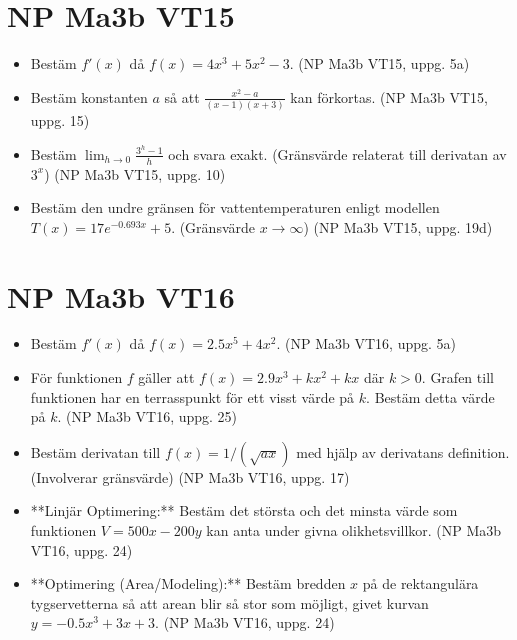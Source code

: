 \documentclass{article}
\begin{document}
\section*{NP Ma3b VT15}
\begin{itemize}
    \item Bestäm $f'(x)$ då $f(x) = 4x^3 + 5x^2 - 3$. (NP Ma3b VT15, uppg. 5a)
    \item Bestäm konstanten $a$ så att $\frac{x^2-a}{(x-1)(x+3)}$ kan förkortas. (NP Ma3b VT15, uppg. 15)
    \item Bestäm $\lim_{h \to 0} \frac{3^h - 1}{h}$ och svara exakt. (Gränsvärde relaterat till derivatan av $3^x$) (NP Ma3b VT15, uppg. 10)
    \item Bestäm den undre gränsen för vattentemperaturen enligt modellen $T(x) = 17e^{-0.693x} + 5$. (Gränsvärde $x \to \infty$) (NP Ma3b VT15, uppg. 19d)
\end{itemize}

\section*{NP Ma3b VT16}
\begin{itemize}
    \item Bestäm $f'(x)$ då $f(x) = 2.5x^5 + 4x^2$. (NP Ma3b VT16, uppg. 5a)
    \item För funktionen $f$ gäller att $f(x) = 2.9x^3 + kx^2 + kx$ där $k>0$. Grafen till funktionen har en terrasspunkt för ett visst värde på $k$. Bestäm detta värde på $k$. (NP Ma3b VT16, uppg. 25)
    \item Bestäm derivatan till $f(x) = 1/(\sqrt{ax})$ med hjälp av derivatans definition. (Involverar gränsvärde) (NP Ma3b VT16, uppg. 17)
    \item **Linjär Optimering:** Bestäm det största och det minsta värde som funktionen $V = 500x - 200y$ kan anta under givna olikhetsvillkor. (NP Ma3b VT16, uppg. 24)
    \item **Optimering (Area/Modeling):** Bestäm bredden $x$ på de rektangulära tygservetterna så att arean blir så stor som möjligt, givet kurvan $y = -0.5x^3 + 3x + 3$. (NP Ma3b VT16, uppg. 24)
\end{itemize}
\end{document}
